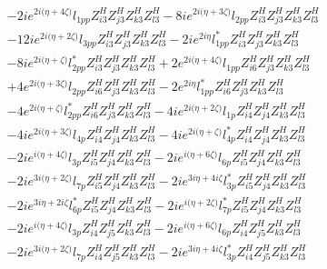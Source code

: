 \begin{align}
 &-2 i e^{2 i \Big(\eta +4 \zeta \Big)} l_{1pp} Z_{{i 3}}^{H} Z_{{j 3}}^{H} Z_{{k 3}}^{H} Z_{{l 3}}^{H} -8 i e^{2 i \Big(\eta +3 \zeta \Big)} l_{2pp} Z_{{i 3}}^{H} Z_{{j 3}}^{H} Z_{{k 3}}^{H} Z_{{l 3}}^{H} \nonumber \\ 
 &-12 i e^{2 i \Big(\eta +2 \zeta \Big)} l_{3pp} Z_{{i 3}}^{H} Z_{{j 3}}^{H} Z_{{k 3}}^{H} Z_{{l 3}}^{H} -2 i e^{2 i \eta } l_{1pp}^* Z_{{i 3}}^{H} Z_{{j 3}}^{H} Z_{{k 3}}^{H} Z_{{l 3}}^{H} \nonumber \\ 
 &-8 i e^{2 i \Big(\eta +\zeta \Big)} l_{2pp}^* Z_{{i 3}}^{H} Z_{{j 3}}^{H} Z_{{k 3}}^{H} Z_{{l 3}}^{H} +2 e^{2 i \Big(\eta +4 \zeta \Big)} l_{1pp} Z_{{i 6}}^{H} Z_{{j 3}}^{H} Z_{{k 3}}^{H} Z_{{l 3}}^{H} \nonumber \\ 
 &+4 e^{2 i \Big(\eta +3 \zeta \Big)} l_{2pp} Z_{{i 6}}^{H} Z_{{j 3}}^{H} Z_{{k 3}}^{H} Z_{{l 3}}^{H} -2 e^{2 i \eta } l_{1pp}^* Z_{{i 6}}^{H} Z_{{j 3}}^{H} Z_{{k 3}}^{H} Z_{{l 3}}^{H} \nonumber \\ 
 &-4 e^{2 i \Big(\eta +\zeta \Big)} l_{2pp}^* Z_{{i 6}}^{H} Z_{{j 3}}^{H} Z_{{k 3}}^{H} Z_{{l 3}}^{H} -4 i e^{2 i \Big(\eta +2 \zeta \Big)} l_{1p} Z_{{i 4}}^{H} Z_{{j 4}}^{H} Z_{{k 3}}^{H} Z_{{l 3}}^{H} \nonumber \\ 
 &-4 i e^{2 i \Big(\eta +3 \zeta \Big)} l_{4p} Z_{{i 4}}^{H} Z_{{j 4}}^{H} Z_{{k 3}}^{H} Z_{{l 3}}^{H} -4 i e^{2 i \Big(\eta +\zeta \Big)} l_{4p}^* Z_{{i 4}}^{H} Z_{{j 4}}^{H} Z_{{k 3}}^{H} Z_{{l 3}}^{H} \nonumber \\ 
 &-2 i e^{i \Big(\eta +4 \zeta \Big)} l_{3p} Z_{{i 5}}^{H} Z_{{j 4}}^{H} Z_{{k 3}}^{H} Z_{{l 3}}^{H} -2 i e^{i \Big(\eta +6 \zeta \Big)} l_{6p} Z_{{i 5}}^{H} Z_{{j 4}}^{H} Z_{{k 3}}^{H} Z_{{l 3}}^{H} \nonumber \\ 
 &-2 i e^{3 i \Big(\eta +2 \zeta \Big)} l_{7p} Z_{{i 5}}^{H} Z_{{j 4}}^{H} Z_{{k 3}}^{H} Z_{{l 3}}^{H} -2 i e^{3 i \eta +4 i \zeta } l_{3p}^* Z_{{i 5}}^{H} Z_{{j 4}}^{H} Z_{{k 3}}^{H} Z_{{l 3}}^{H} \nonumber \\ 
 &-2 i e^{3 i \eta +2 i \zeta } l_{6p}^* Z_{{i 5}}^{H} Z_{{j 4}}^{H} Z_{{k 3}}^{H} Z_{{l 3}}^{H} -2 i e^{i \Big(\eta +2 \zeta \Big)} l_{7p}^* Z_{{i 5}}^{H} Z_{{j 4}}^{H} Z_{{k 3}}^{H} Z_{{l 3}}^{H} \nonumber \\ 
 &-2 i e^{i \Big(\eta +4 \zeta \Big)} l_{3p} Z_{{i 4}}^{H} Z_{{j 5}}^{H} Z_{{k 3}}^{H} Z_{{l 3}}^{H} -2 i e^{i \Big(\eta +6 \zeta \Big)} l_{6p} Z_{{i 4}}^{H} Z_{{j 5}}^{H} Z_{{k 3}}^{H} Z_{{l 3}}^{H} \nonumber \\ 
 &-2 i e^{3 i \Big(\eta +2 \zeta \Big)} l_{7p} Z_{{i 4}}^{H} Z_{{j 5}}^{H} Z_{{k 3}}^{H} Z_{{l 3}}^{H} -2 i e^{3 i \eta +4 i \zeta } l_{3p}^* Z_{{i 4}}^{H} Z_{{j 5}}^{H} Z_{{k 3}}^{H} Z_{{l 3}}^{H} \nonumber \\ 

\end{align}
